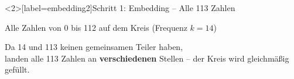 \documentclass[aspectratio=169, 12pt]{beamer}
\begin{document}
\begin{frame}<2>[label=embedding2]{Schritt 1: Embedding -- Alle 113 Zahlen}
  \begin{center}
    {\large Alle Zahlen von 0 bis 112 auf dem Kreis (Frequenz $k=14$)}
  \end{center}

  \bigskip
  \begin{center}
  \end{center}

  \begin{center}
    \small Da 14 und 113 keinen gemeinsamen Teiler haben,\\
    landen alle 113 Zahlen an \textbf{verschiedenen} Stellen -- der Kreis wird gleichm\"a\ss ig gef\"ullt.
  \end{center}
\end{frame}
\end{document}
